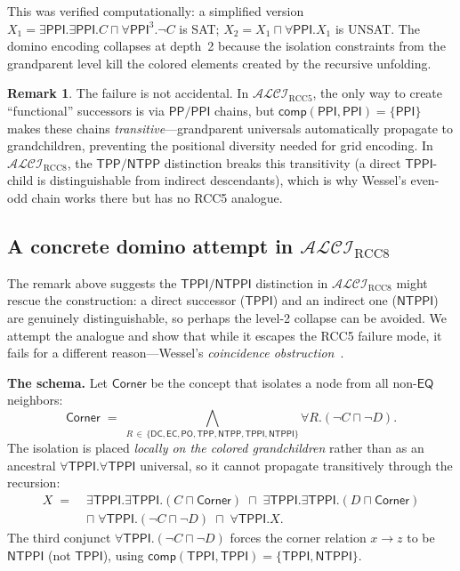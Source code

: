 \documentclass[11pt]{article}
\newcommand{\ALCIRCC}[1]{\mathcal{ALCI}_{\mathrm{RCC#1}}}
\newcommand{\PO}{\mathsf{PO}}
\newcommand{\PP}{\mathsf{PP}}
\newcommand{\PPI}{\mathsf{PPI}}
\newcommand{\EQ}{\mathsf{EQ}}
\newcommand{\TPP}{\ensuremath{\mathsf{TPP}}}
\newcommand{\NTPP}{\ensuremath{\mathsf{NTPP}}}
\newcommand{\TPPI}{\ensuremath{\mathsf{TPPI}}}
\newcommand{\NTPPI}{\ensuremath{\mathsf{NTPPI}}}
\newcommand{\DC}{\ensuremath{\mathsf{DC}}}
\newcommand{\EC}{\ensuremath{\mathsf{EC}}}
\newcommand{\comp}{\ensuremath{\mathsf{comp}}}
\theoremstyle{plain}
\theoremstyle{definition}
\newtheorem{remark}[theorem]{Remark}
\begin{document}
This was verified computationally: a simplified version
$X_1 = \exists\PPI.\exists\PPI.C \sqcap \forall\PPI^3.\neg C$
is SAT; $X_2 = X_1 \sqcap \forall\PPI.X_1$ is UNSAT.
The domino encoding collapses at depth~2 because the isolation
constraints from the grandparent level kill the colored elements
created by the recursive unfolding.

\begin{remark}
The failure is not accidental.  In $\ALCIRCC{5}$, the only way to
create ``functional'' successors is via $\PP/\PPI$ chains, but
$\comp(\PPI,\PPI) = \{\PPI\}$ makes these chains
\emph{transitive}---grandparent universals automatically propagate
to grandchildren, preventing the positional diversity needed for
grid encoding.  In $\ALCIRCC{8}$, the $\TPP/\NTPP$ distinction
breaks this transitivity (a direct $\TPPI$-child is distinguishable
from indirect descendants), which is why Wessel's even-odd chain
works there but has no RCC5 analogue.
\end{remark}

\subsection{A concrete domino attempt in $\ALCIRCC{8}$}
\label{sec:domino-attempt-rcc8}

The remark above suggests the $\TPPI/\NTPPI$ distinction in
$\ALCIRCC{8}$ might rescue the construction: a direct successor
($\TPPI$) and an indirect one ($\NTPPI$) are genuinely
distinguishable, so perhaps the level-2 collapse can be avoided.
We attempt the analogue and show that while it escapes the RCC5
failure mode, it fails for a different reason---Wessel's
\emph{coincidence obstruction}~\cite{Wessel2003}.

\medskip\noindent\textbf{The schema.} Let $\textsf{Corner}$ be the
concept that isolates a node from all non-$\EQ$ neighbors:
\[
  \textsf{Corner} \;=\;
  \bigwedge_{R \,\in\, \{\DC,\EC,\PO,\TPP,\NTPP,\TPPI,\NTPPI\}}
    \forall R.(\neg C \sqcap \neg D).
\]
The isolation is placed \emph{locally on the colored grandchildren}
rather than as an ancestral $\forall\TPPI.\forall\TPPI$ universal,
so it cannot propagate transitively through the recursion:
\begin{align*}
  X \;=\; &\exists\TPPI.\exists\TPPI.(C \sqcap \textsf{Corner})
    \;\sqcap\; \exists\TPPI.\exists\TPPI.(D \sqcap \textsf{Corner}) \\
  &\sqcap\; \forall\TPPI.(\neg C \sqcap \neg D)
    \;\sqcap\; \forall\TPPI.X.
\end{align*}
The third conjunct $\forall\TPPI.(\neg C \sqcap \neg D)$ forces the
corner relation $x \to z$ to be $\NTPPI$ (not $\TPPI$), using
$\comp(\TPPI,\TPPI) = \{\TPPI, \NTPPI\}$.
\end{document}

